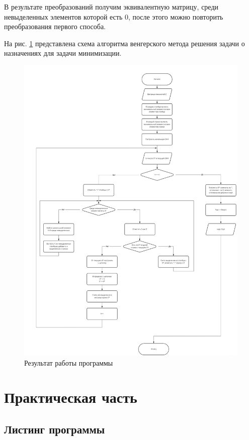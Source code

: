 \documentclass[a4paper,14pt]{article}
\begin{document}
В результате преобразований получим эквивалентную матрицу, среди невыделенных элементов которой есть 0, после этого можно повторить преобразования первого способа.

На рис. \ref{schema} представлена схема алгоритма венгерского метода решения задачи о назначениях для задачи минимизации.

\begin{figure}[H]
	\begin{center}
    	\includegraphics[scale=0.7]{schema2}
        \caption{Результат работы программы}
        \label{schema}
	\end{center}
\end{figure}

\section{Практическая часть}

\subsection{Листинг программы}
\end{document}
